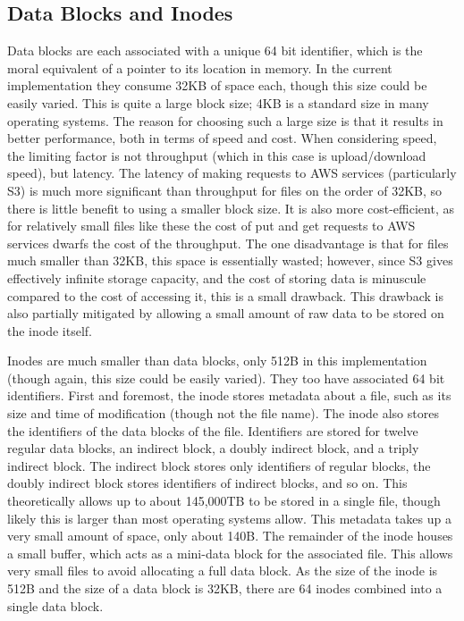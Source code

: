 \documentclass[11pt]{article}
\begin{document}
\subsection{Data Blocks and Inodes}
Data blocks are each associated with a unique 64 bit identifier, which is the moral equivalent of a pointer to its location in memory. In the current implementation they consume 32KB of space each, though this size could be easily varied. This is quite a large block size; 4KB is a standard size in many operating systems. The reason for choosing such a large size is that it results in better performance, both in terms of speed and cost. When considering speed, the limiting factor is not throughput (which in this case is upload/download speed), but latency. The latency of making requests to AWS services (particularly S3) is much more significant than throughput for files on the order of 32KB, so there is little benefit to using a smaller block size. It is also more cost-efficient, as for relatively small files like these the cost of put and get requests to AWS services dwarfs the cost of the throughput. The one disadvantage is that for files much smaller than 32KB, this space is essentially wasted; however, since S3 gives effectively infinite storage capacity, and the cost of storing data is minuscule compared to the cost of accessing it, this is a small drawback. This drawback is also partially mitigated by allowing a small amount of raw data to be stored on the inode itself.

Inodes are much smaller than data blocks, only 512B in this implementation (though again, this size could be easily varied). They too have associated 64 bit identifiers. First and foremost, the inode stores metadata about a file, such as its size and time of modification (though not the file name). The inode also stores the identifiers of the data blocks of the file. Identifiers are stored for twelve regular data blocks, an indirect block, a doubly indirect block, and a triply indirect block. The indirect block stores only identifiers of regular blocks, the doubly indirect block stores identifiers of indirect blocks, and so on. This theoretically allows up to about 145,000TB to be stored in a single file, though likely this is larger than most operating systems allow. This metadata takes up a very small amount of space, only about 140B. The remainder of the inode houses a small buffer, which acts as a mini-data block for the associated file. This allows very small files to avoid allocating a full data block. As the size of the inode is 512B and the size of a data block is 32KB, there are 64 inodes combined into a single data block.
\end{document}
